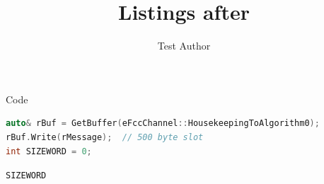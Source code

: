 \documentclass[aspectratio=169,10pt]{beamer}
\title{Listings after}
\author{Test Author}
\begin{document}
\begin{frame}[fragile]{Code}
	\begin{lstlisting}[language=C++]
auto& rBuf = GetBuffer(eFccChannel::HousekeepingToAlgorithm0);
rBuf.Write(rMessage);  // 500 byte slot
int SIZEWORD = 0;
	\end{lstlisting}
	\texttt{\tiny SIZEWORD}
\end{frame}
\end{document}
